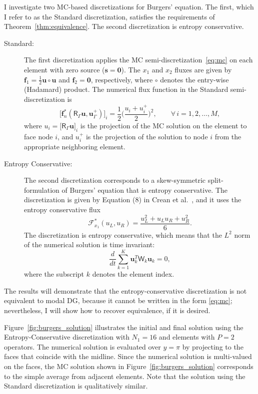 \documentclass[pdflatex,sn-mathphys-num]{sn-jnl}%
\theoremstyle{thmstyleone}%
\theoremstyle{thmstyletwo}%
\theoremstyle{thmstylethree}%
\newcommand{\mat}[1]{\ensuremath{\mathsf{#1}}}
\newcommand{\fnc}[1]{\ensuremath{\mathcal{#1}}}
\begin{document}
I investigate two MC-based discretizations for Burgers' equation.  The first, which I refer to as the Standard discretization, satisfies the requirements of Theorem~\ref{thm:equivalence}.  The second discretization is entropy conservative.

\begin{description}
\item[Standard:] The first discretization applies the MC semi-discretization~\eqref{eq:mc} on each element with zero source ($\bm{s} = \bm{0}$).  The $x_1$ and $x_2$ fluxes are given by $\bm{f}_{1} = \frac{1}{2} \bm{u} \circ \bm{u}$ and $\bm{f}_{2} = \bm{0}$, respectively, where $\circ$ denotes the entry-wise (Hadamard) product.  The numerical flux function in the Standard semi-discretization is 
\begin{equation*}
\big[ \bm{f}_{n}^{*}(\mat{R}_{\Gamma} \bm{u}, \bm{u}_\Gamma^{+}) \big]_i
= \frac{1}{2} \bigg( \frac{u_i + u_i^{+}}{2} \bigg)^2,
\qquad\forall\, i=1,2,\ldots,M,
\end{equation*}
where $u_i = \big[ \mat{R}_{\Gamma} \bm{u} \big]_i$ is the projection of the MC solution on the element to face node $i$, and $u_i^+$ is the projection of the solution to node $i$ from the appropriate neighboring element.

\item[Entropy Conservative:] The second discretization corresponds to a skew-symmetric split-formulation of Burgers' equation that is entropy conservative.  The discretization is given by Equation (8) in Crean et al.~\cite{Crean2018entropy}, and it uses the entropy conservative flux 
\begin{equation*}
    \fnc{F}_{x_1}^*(u_L, u_R) = \frac{u_L^2 + u_L u_R + u_R^2}{6}.
\end{equation*}
The discretization is entropy conservative, which means that the $L^2$ norm of the numerical solution is time invariant:
\begin{equation*}
\frac{d}{dt} \sum_{k=1}^{K} \bm{u}_k^T \mat{W}_k \bm{u}_k = 0,
\end{equation*}
where the subscript $k$ denotes the element index.
\end{description}
The results will demonstrate that the entropy-conservative discretization is not equivalent to modal DG, because it cannot be written in the form \eqref{eq:mc}; nevertheless, I will show how to recover equivalence, if it is desired.  

Figure~\ref{fig:burgers_solution} illustrates the initial and final solution using the Entropy-Conservative discretization with $N_1 = 16$ and elements with $P=2$ operators.  The numerical solution is evaluated over $y=\pi$ by projecting to the faces that coincide with the midline.  Since the numerical solution is multi-valued on the faces, the MC solution shown in Figure~\ref{fig:burgers_solution} corresponds to the simple average from adjacent elements.  Note that the solution using the Standard discretization is qualitatively similar.
\end{document}
